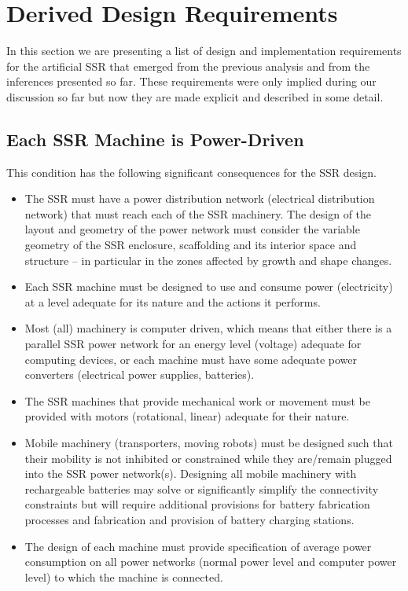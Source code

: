 \section{Derived Design Requirements}

In this section we are presenting a list of design and implementation
requirements for the artificial SSR that emerged from the previous
analysis and from the inferences presented so far. These requirements
were only implied during our discussion so far but now they are made
explicit and described in some detail.

\subsection[Each SSR Machine is Power{}-Driven]{Each SSR Machine is
Power-Driven}

\hypertarget{RefHeading3130306210128}{}This condition has the following
significant consequences for the SSR design.

\begin{itemize}
\item The SSR must have a power distribution network (electrical
distribution network) that must reach each of the SSR machinery. The
design of the layout and geometry of the power network must consider
the variable geometry of the SSR enclosure, scaffolding and its
interior space and structure – in particular in the zones affected by
growth and shape changes.
\item Each SSR machine must be designed to use and consume power
(electricity) at a level adequate for its nature and the actions it
performs. 
\item Most (all) machinery is computer driven, which means that either
there is a parallel SSR power network for an energy level (voltage)
adequate for computing devices, or each machine must have some adequate
power converters (electrical power supplies, batteries).
\item The SSR machines that provide mechanical work or movement must be
provided with motors (rotational, linear) adequate for their nature.
\item Mobile machinery (transporters, moving robots) must be designed
such that their mobility is not inhibited or constrained while they
are/remain plugged into the SSR power network(s).  Designing all mobile
machinery with rechargeable batteries may solve or significantly
simplify the connectivity constraints but will require additional
provisions for battery fabrication processes and fabrication and
provision of battery charging stations.
\item The design of each machine must provide specification of average
power consumption on all power networks (normal power level and
computer power level) to which the machine is connected.
\end{itemize}

